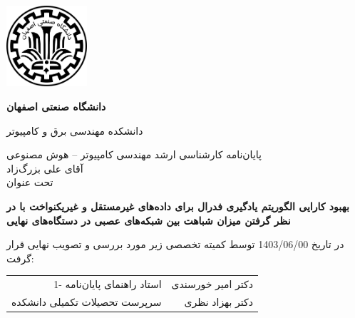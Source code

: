 \thispagestyle{empty}
\begin{center}
\includegraphics[height=3cm]{iut_logo.png}
\vspace{0.4cm}

\textbf{دانشگاه صنعتی اصفهان}\\
\vspace{0.4cm}

{\large
	دانشکده مهندسی برق و کامپیوتر
}
\vspace{1.8cm}

\vfill

{\Large
	پایان‌نامه کارشناسی ارشد مهندسی کامپیوتر --
	هوش مصنوعی ‎\\
	\vspace{.2cm}
	آقای علی بزرگ‌زاد
	\\
	\vspace{.3cm}
	تحت عنوان\\
}


\end{center}
\vfill
\vspace{2.5cm}

{\large
	\noindent
	\textbf{
	بهبود کارایی الگوریتم یادگیری فدرال برای داده‌های غیرمستقل و غیریکنواخت با در نظر گرفتن میزان شباهت بین شبکه‌های عصبی در دستگاه‌های نهایی
	}
}

\vspace*{2cm}

در تاریخ 1403/06/00 توسط کمیته تخصصی زیر مورد بررسی و تصویب نهایی قرار گرفت:\\
\vspace{0.8cm}

{\normalsize
	
	\begin{tabular}{rr}
	\vspace*{.8cm}
	1- استاد راهنمای پایان‌نامه  & \hspace{2cm} دکتر امیر خورسندی \\
	\vspace{.8cm}
	سرپرست تحصیلات تکمیلی دانشکده &\hspace{2cm} دکتر بهزاد نظری \\
	\end{tabular}
}
\restoregeometry
\pagebreak

